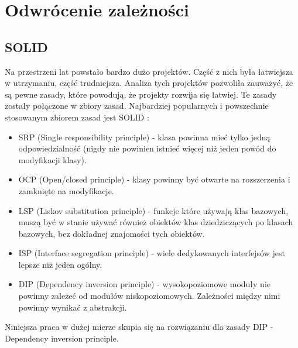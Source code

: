 \documentclass[12pt]{article}
\begin{document}
\clearpage
\section{Odwrócenie zależności}
\subsection{SOLID}
Na przestrzeni lat powstało bardzo dużo projektów. Część z nich była łatwiejsza w utrzymaniu, część trudniejsza. Analiza tych projektów pozwoliła zauważyć, że są pewne zasady, które powodują, że projekty rozwija się łatwiej. Te zasady zostały połączone w zbiory zasad. Najbardziej popularnych i powszechnie stosowanym zbiorem zasad jest SOLID \cite{SOLID}:
\begin{itemize}
	\item SRP (Single responsibility principle) - klasa powinna mieć tylko jedną odpowiedzialność (nigdy nie powinien istnieć więcej niż jeden powód do modyfikacji klasy).
	\item OCP (Open/closed principle) - klasy powinny być otwarte na rozszerzenia i zamknięte na modyfikacje.
	\item LSP (Liskov substitution principle) - funkcje które używają klas bazowych, muszą być w stanie używać również obiektów klas dziedziczących po klasach bazowych, bez dokładnej znajomości tych obiektów.
	\item ISP (Interface segregation principle) - wiele dedykowanych interfejsów jest lepsze niż jeden ogólny.
	\item DIP (Dependency inversion principle) - wysokopoziomowe moduły nie powinny zależeć od modułów niskopoziomowych. Zależności między nimi powinny wynikać z abstrakcji.
\end{itemize}
Niniejsza praca w dużej mierze skupia się na rozwiązaniu dla zasady DIP - Dependency inversion principle. 
\end{document}
